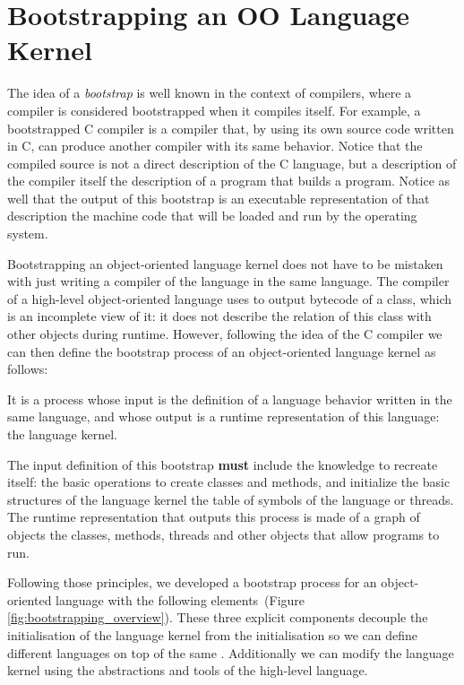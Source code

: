 \section{Bootstrapping an OO Language Kernel}\label{sec:bootstrapping}

The idea of a \emph{bootstrap} is well known in the context of compilers, where a compiler is considered bootstrapped when it compiles itself. For example, a bootstrapped C compiler is a compiler that, by using its own source code written in C, can produce another compiler with its same behavior. Notice that the compiled source is not a direct description of the C language, but a description of the compiler itself \ie the description of a program that builds a program. Notice as well that the output of this bootstrap is an executable representation of that description \ie the machine code that will be loaded and run by the operating system.

Bootstrapping an object-oriented language kernel does not have to be mistaken with just writing a compiler of the language in the same language. The compiler of a high-level object-oriented language uses to output  bytecode of a class, which is an incomplete view of it: it does not describe the relation of this class with other objects during runtime. However, following the idea of the C compiler we can then define the bootstrap process of an object-oriented language kernel as follows:

\begin{definition}
It is a process whose input is the definition of a language behavior written in the same language, and whose output is a runtime representation of this language: the language kernel. 
\end{definition}

The input definition of this bootstrap \textbf{must} include the knowledge to recreate itself: the basic operations to create classes and methods, and initialize the basic structures of the language kernel \eg the table of symbols of the language or threads. The runtime representation that outputs this process is made of a graph of objects \ie the classes, methods, threads and other objects that allow programs to run.

Following those principles, we developed a bootstrap process for an object-oriented language with the following elements~(Figure \ref{fig:bootstrapping_overview}). These three explicit components decouple the initialisation of the language kernel from the \VM initialisation so we can define different languages on top of the same \VM. Additionally we can modify the language kernel using the abstractions and tools of the high-level language.

